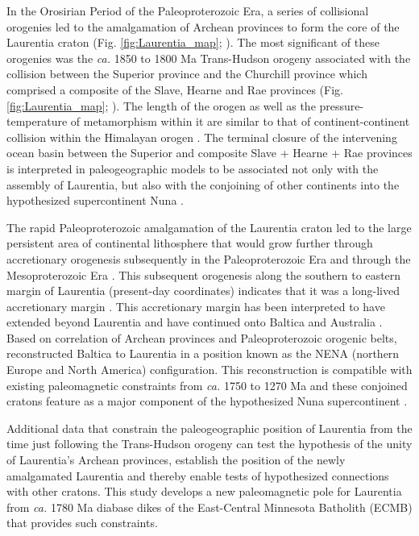 \documentclass[draft]{agujournal2019}
\begin{document}
In the Orosirian Period of the Paleoproterozoic Era, a series of collisional orogenies led to the amalgamation of Archean provinces to form the core of the Laurentia craton (Fig. \ref{fig:Laurentia_map}; ). The most significant of these orogenies was the \textit{ca.} 1850 to 1800 Ma Trans-Hudson orogeny associated with the collision between the Superior province and the Churchill province which comprised a composite of the Slave, Hearne and Rae provinces (Fig. \ref{fig:Laurentia_map}; ). The length of the orogen as well as the pressure-temperature of metamorphism within it are similar to that of continent-continent collision within the Himalayan orogen \cite{Weller2017a}. The terminal closure of the intervening ocean basin between the Superior and composite Slave + Hearne + Rae provinces is interpreted in paleogeographic models to be associated not only with the assembly of Laurentia, but also with the conjoining of other continents into the hypothesized supercontinent Nuna \cite{Pehrsson2015a}.

The rapid Paleoproterozoic amalgamation of the Laurentia craton led to the large persistent area of continental lithosphere that would grow further through accretionary orogenesis subsequently in the Paleoproterozoic Era and through the Mesoproterozoic Era \cite{Whitmeyer2007a}. This subsequent orogenesis along the southern to eastern margin of Laurentia (present-day coordinates) indicates that it was a long-lived accretionary margin \cite{Karlstrom2001a, Whitmeyer2007a}. This accretionary margin has been interpreted to have extended beyond Laurentia and have continued onto Baltica and Australia \cite{Karlstrom2001a}. Based on correlation of Archean provinces and Paleoproterozoic orogenic belts,  reconstructed Baltica to Laurentia in a position known as the NENA (northern Europe and North America) configuration. This reconstruction is compatible with existing paleomagnetic constraints from \textit{ca.} 1750 to 1270 Ma \cite{Evans2008a} and these conjoined cratons feature as a major component of the hypothesized Nuna supercontinent \cite{Evans2011a, Zhang2012a}. 

Additional data that constrain the paleogeographic position of Laurentia from the time just following the Trans-Hudson orogeny can test the hypothesis of the unity of Laurentia's Archean provinces, establish the position of the newly amalgamated Laurentia and thereby enable tests of hypothesized connections with other cratons. This study develops a new paleomagnetic pole for Laurentia from \textit{ca.} 1780 Ma diabase dikes of the East-Central Minnesota Batholith (ECMB) that provides such constraints.
\end{document}
